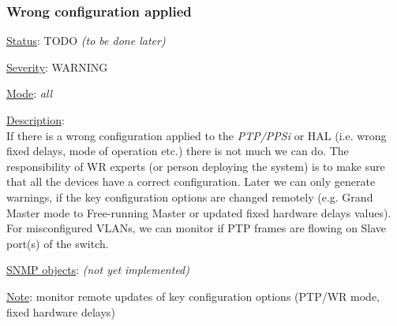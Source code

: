 \subsubsection{\bf Wrong configuration applied}
		\label{fail:timing:wrong_config}
		\begin{pck_descr}
			\item [] \underline{Status}: TODO \emph{(to be done later)}
			\item [] \underline{Severity}: WARNING
			\item [] \underline{Mode}: \emph{all}
			\item [] \underline{Description}:\\
				If there is a wrong configuration applied to the \emph{PTP/PPSi} or HAL
				(i.e.  wrong fixed delays, mode of operation etc.) there is not much we
				can do. The responsibility of WR experts (or person deploying the
				system) is to make sure that all the devices have a correct
				configuration. Later we can only generate warnings, if the key
				configuration options are changed remotely (e.g. Grand Master mode to
				Free-running Master or updated fixed hardware delays values).\\
				For misconfigured VLANs, we can monitor if PTP frames are flowing on
				Slave port(s) of the switch.
			\item [] \underline{SNMP objects}: \emph{(not yet implemented)}
			\item [] \underline{Note}: monitor remote updates of key configuration
				options (PTP/WR mode, fixed hardware delays)
		\end{pck_descr}

